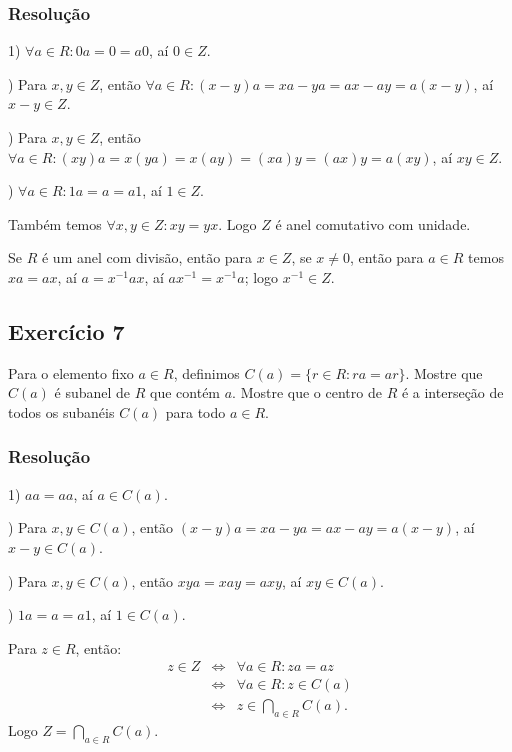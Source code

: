\documentclass[10pt,a4paper]{article}
\begin{document}
\subsubsection*{Resolução}

1) $\forall a\in R:0a=0=a0$, aí $0\in Z$.

\medskip
{}) Para $x,y\in Z$, então $\forall a\in R:(x-y)a=xa-ya=ax-ay=a(x-y)$, aí $x-y\in Z$.

\medskip
{}) Para $x,y\in Z$, então $\forall a\in R:(xy)a=x(ya)=x(ay)=(xa)y=(ax)y=a(xy)$, aí $xy\in Z$.

\medskip
{}) $\forall a\in R:1a=a=a1$, aí $1\in Z$.

\medskip
\noindent
Também temos $\forall x,y\in Z:xy=yx$. Logo $Z$ é anel comutativo com unidade.

\medskip
\noindent
Se $R$ é um anel com divisão, então para $x\in Z$, se $x\neq 0$, então para $a\in R$ temos $xa=ax$, aí $a=x^{-1}ax$, aí $ax^{-1}=x^{-1}a$; logo $x^{-1}\in Z$.

\subsection*{Exercício 7}

Para o elemento fixo $a\in R$, definimos $C(a)=\{r\in R:ra=ar\}$. Mostre que $C(a)$ é subanel de $R$ que contém $a$. Mostre que o centro de $R$ é a interseção de todos os subanéis $C(a)$ para todo $a\in R$.

\subsubsection*{Resolução}

1) $aa=aa$, aí $a\in C(a)$.

\medskip
{}) Para $x,y\in C(a)$, então $(x-y)a=xa-ya=ax-ay=a(x-y)$, aí $x-y\in C(a)$.

\medskip
{}) Para $x,y\in C(a)$, então $xya=xay=axy$, aí $xy\in C(a)$.

\medskip
{}) $1a=a=a1$, aí $1\in C(a)$.

\medskip
\noindent
Para $z\in R$, então:
\[
\begin{array}{rcl}
z\in Z&\Leftrightarrow&\forall a\in R:za=az\\&\Leftrightarrow&\forall a\in R:z\in C(a)\\&\Leftrightarrow&z\in\bigcap_{a\in R}C(a).
\end{array}
\]
Logo $Z=\bigcap_{a\in R}C(a)$.
\end{document}
